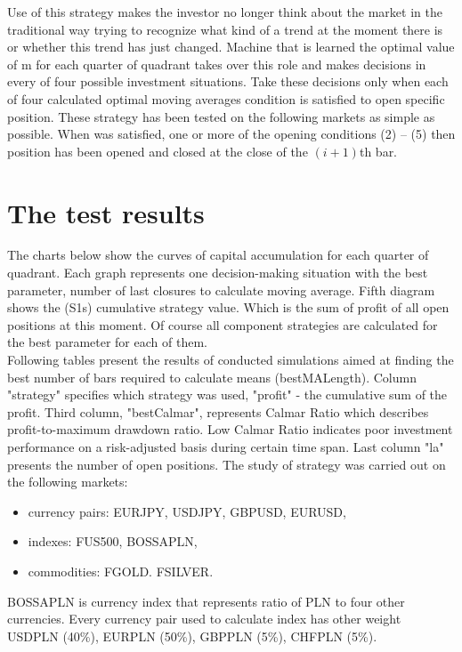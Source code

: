 \documentclass{tewiart}
\begin{document}
Use of this strategy makes the investor no longer think about the market in the traditional way trying to recognize what kind of a trend at the moment there is or whether this trend has just changed. Machine that is learned the optimal value of m for each quarter of quadrant takes over this role and makes decisions in every of four possible investment situations. Take these decisions only when each of four calculated optimal moving averages condition is satisfied to open specific position.
These strategy has been tested on the following markets as simple as possible. When was satisfied, one or more of the opening conditions (2) – (5) then position has been opened and closed at the close of the $(i +1)$th bar.





\section{The test results}
\indent The charts below show the curves of capital accumulation for each quarter of quadrant. Each graph represents one decision-making situation with the best parameter, number of last closures to calculate moving average. Fifth diagram shows the (S1s) cumulative strategy value. Which is the sum of profit of all open positions at this moment. Of course all component strategies are calculated for the best parameter for each of them.\\
\indent Following tables present the results of conducted simulations aimed at finding the best number of bars required to calculate means (bestMALength). Column "strategy" specifies which strategy was used, "profit" - the cumulative sum of the profit. Third column, "bestCalmar", represents Calmar Ratio which describes profit-to-maximum drawdown ratio. Low Calmar Ratio indicates poor investment performance on a risk-adjusted basis during certain time span. Last column "la" presents the number of open positions.
The study of strategy was carried out on the following markets:
\begin{itemize}
\item currency pairs: EURJPY, USDJPY, GBPUSD, EURUSD,
\item indexes: FUS500, BOSSAPLN,
\item commodities: FGOLD. FSILVER.
\end{itemize}
BOSSAPLN is currency index that represents ratio of PLN to four other currencies. Every currency pair used to calculate index has other weight USDPLN (40\%), EURPLN (50\%), GBPPLN (5\%), CHFPLN (5\%).
\end{document}
